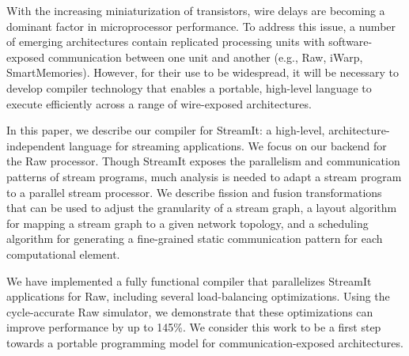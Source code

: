 With the increasing miniaturization of transistors, wire delays are
becoming a dominant factor in microprocessor performance.  To address
this issue, a number of emerging architectures contain replicated
processing units with software-exposed communication between one unit
and another (e.g., Raw, iWarp, SmartMemories).  However, for
their use to be widespread, it will be necessary to develop compiler
technology that enables a portable, high-level language to execute
efficiently across a range of wire-exposed architectures.

In this paper, we describe our compiler for StreamIt: a high-level,
architecture-independent language for streaming applications.  We
focus on our backend for the Raw processor.  Though StreamIt exposes
the parallelism and communication patterns of stream programs, much
analysis is needed to adapt a stream program to a parallel stream
processor.  We describe fission and fusion transformations that can be
used to adjust the granularity of a stream graph, a layout algorithm
for mapping a stream graph to a given network topology, and a
scheduling algorithm for generating a fine-grained static
communication pattern for each computational element.

We have implemented a fully functional compiler that parallelizes
StreamIt applications for Raw, including several load-balancing
optimizations.  Using the cycle-accurate Raw simulator, we demonstrate
that these optimizations can improve performance by up to 145\%.  We
consider this work to be a first step towards a portable programming
model for communication-exposed architectures.

